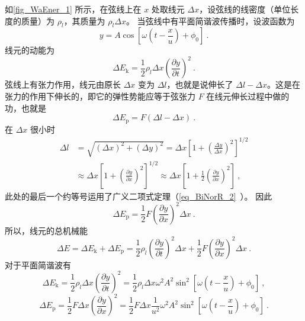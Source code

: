 如\autoref{fig_WaEner_1} 所示，在弦线上在 $x$ 处取线元 $\Delta x$，设弦线的线密度（单位长度的质量）为 $\rho_l$，其质量为 $\rho_l\Delta x$。
当弦线中有平面简谐波传播时，设波函数为
\begin{equation}
y=A \cos \left[\omega\left(t-\frac{x}{u}\right)+\phi_{0}\right]~.
\end{equation}
线元的动能为
\begin{equation}
\Delta E_{\mathrm{k}}=\frac{1}{2} \rho_{l} \Delta x\left(\frac{\partial y}{\partial t}\right)^{2}~.
\end{equation}
弦线上有张力作用，线元由原长 $\Delta x$ 变为 $\Delta l$，也就是说伸长了 $\Delta l-\Delta x$。这是在张力的作用下伸长的，即它的弹性势能应等于弦张力 $F$ 在线元伸长过程中做的功，也就是
\begin{equation}
\Delta E_{\mathrm{p}}=F(\Delta l-\Delta x)~.
\end{equation}
在 $\Delta x$ 很小时
\begin{equation}
\begin{aligned} \Delta l &=\sqrt{(\Delta x)^{2}+(\Delta y)^{2}}=\Delta x\left[1+\left(\frac{\Delta y}{\Delta x}\right)^{2}\right]^{1 / 2} \\ & \approx \Delta x\left[1+\left(\frac{\partial y}{\partial x}\right)^{2}\right]^{1 / 2} \approx \Delta x\left[1+\frac{1}{2}\left(\frac{\partial y}{\partial x}\right)^{2}\right] ~,\end{aligned}
\end{equation}
此处的最后一个约等号运用了广义二项式定理（\autoref{eq_BiNorR_2}~）。
因此
\begin{equation}
\Delta E_{\mathrm{p}}=\frac{1}{2} F\left(\frac{\partial y}{\partial x}\right)^{2} \Delta x~.
\end{equation}
所以，线元的总机械能
\begin{equation}
\Delta E=\Delta E_{\mathrm{k}}+\Delta E_{\mathrm{p}}=\frac{1}{2} \rho_{l}\left(\frac{\partial y}{\partial t}\right)^{2} \Delta x+\frac{1}{2} F\left(\frac{\partial y}{\partial x}\right)^{2} \Delta x~.
\end{equation}
对于平面简谐波有
\begin{equation}
\Delta E_{\mathrm{k}}=\frac{1}{2} \rho_{l} \Delta x\left(\frac{\partial y}{\partial t}\right)^{2}=\frac{1}{2} \rho_{l} \Delta x \omega^{2} A^{2} \sin ^{2}\left[\omega\left(t-\frac{x}{u}\right)+\phi_{0}\right]~,
\end{equation}
\begin{equation}
\Delta E_{\mathrm{p}}=\frac{1}{2} F \Delta x\left(\frac{\partial y}{\partial x}\right)^{2}=\frac{1}{2} F \Delta x \frac{1}{u^{2}} \omega^{2} A^{2} \sin ^{2}\left[\omega\left(t-\frac{x}{u}\right)+\phi_{0}\right]~.
\end{equation}
